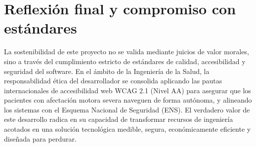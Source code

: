 \section{Reflexión final y compromiso con estándares}
La sostenibilidad de este proyecto no se valida mediante juicios de valor morales, sino a través del cumplimiento estricto de estándares de calidad, accesibilidad y seguridad del software. En el ámbito de la Ingeniería de la Salud, la responsabilidad ética del desarrollador se consolida aplicando las pautas internacionales de accesibilidad web WCAG 2.1 (Nivel AA) \cite{w3c:wcag21} para asegurar que los pacientes con afectación motora severa naveguen de forma autónoma, y alineando los sistemas con el Esquema Nacional de Seguridad (ENS). El verdadero valor de este desarrollo radica en su capacidad de transformar recursos de ingeniería acotados en una solución tecnológica medible, segura, económicamente eficiente y diseñada para perdurar.